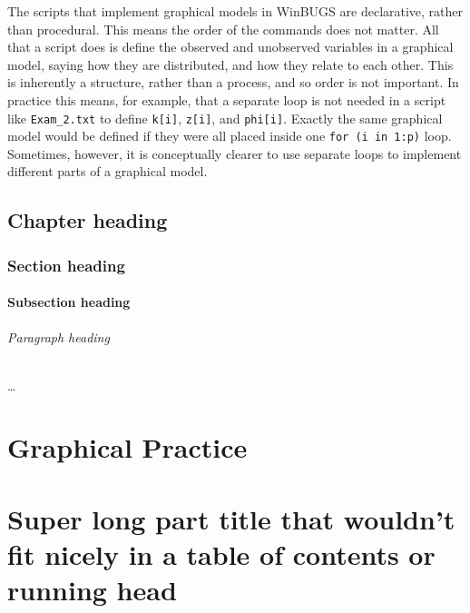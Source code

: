\documentclass{bayeshyp}
\begin{document}
\lipsum

\begin{graybg}
  The scripts that implement graphical models in WinBUGS are declarative,
  rather than procedural. This means the order of the commands does not matter.
  All that a script does is define the observed and unobserved variables in a
  graphical model, saying how they are distributed, and how they relate to each
  other. This is inherently a structure, rather than a process, and so order is
  not important. In practice this means, for example, that a separate loop is
  not needed in a script like \texttt{Exam\_2.txt} to define \texttt{k[i]},
  \texttt{z[i]}, and \texttt{phi[i]}. Exactly the same graphical model would be
  defined if they were all placed inside one \texttt{for (i in 1:p)} loop.
  Sometimes, however, it is conceptually clearer to use separate loops to
  implement different parts of a graphical
  model.\label{scriptsforgraphicalmodels}
\end{graybg}

\lipsum


\chapter[byline={with Kevin}]{Chapter heading}
\section{Section heading}
\subsection{Subsection heading}
\paragraph{Paragraph heading} \ldots


\Blinddocument

\part[image={example-image-a}]{Graphical Practice}

\part[image={example-image-b},image-options={width=0.25\textwidth},toc={Shorter part title}]{Super long part title that wouldn't fit nicely in a table of contents or running head}
\end{document}
